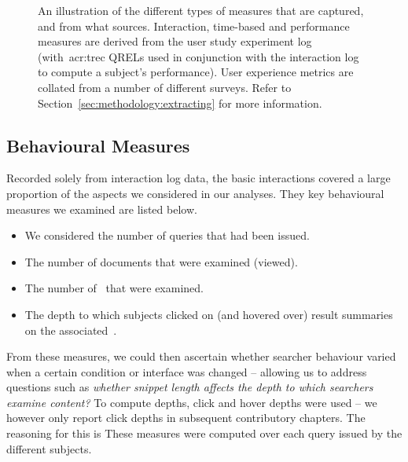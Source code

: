 \begin{figure}[t!]
    \centering
    \caption[Examples of evaluation measures]{An illustration of the different types of measures that are captured, and from what sources. Interaction, time-based and performance measures are derived from the user study experiment log (with~\gls{acr:trec} QRELs used in conjunction with the interaction log to compute a subject's performance). User experience metrics are collated from a number of different surveys. Refer to Section~\ref{sec:methodology:extracting} for more information.}
    \label{fig:evaluation_methodology}
\end{figure}

\subsection{Behavioural Measures}
Recorded solely from interaction log data, the basic interactions covered a large proportion of the aspects we considered in our analyses. They key behavioural measures we examined are listed below.

\begin{itemize}
    \item{ We considered the number of queries that had been issued.}
    \item{ The number of documents that were examined (viewed).}
    \item{ The number of~ that were examined.}
    \item{ The depth to which subjects clicked on (and hovered over) result summaries on the associated~.}
\end{itemize}

From these measures, we could then ascertain whether searcher behaviour varied when a certain condition or interface was changed -- allowing us to address questions such as \emph{whether snippet length affects the depth to which searchers examine content?} To compute depths, click and hover depths were used -- we however only report click depths in subsequent contributory chapters. The reasoning for this is  These measures were computed over each query issued by the different subjects.

